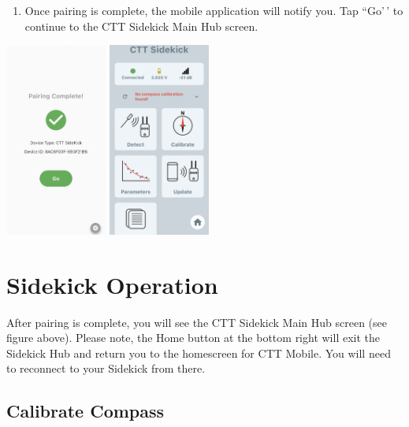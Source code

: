 \documentclass[
]{article}
\providecommand{\tightlist}{%
  \setlength{\itemsep}{0pt}\setlength{\parskip}{0pt}}
\begin{document}
\begin{enumerate}
\def\labelenumi{\arabic{enumi}.}
\setcounter{enumi}{3}
\tightlist
\item
  Once pairing is complete, the mobile application will notify you. Tap
  ``Go'\,' to continue to the CTT Sidekick Main Hub screen.
\end{enumerate}

\includegraphics[width=0.25\textwidth,height=\textheight]{./images/CTT Mobile_4.jpg}
\includegraphics[width=0.25\textwidth,height=\textheight]{./images/CTT Mobile_5.jpg}

\hypertarget{sidekick-operation}{%
\section{Sidekick Operation}\label{sidekick-operation}}

After pairing is complete, you will see the CTT Sidekick Main Hub screen
(see figure above). Please note, the Home button at the bottom right
will exit the Sidekick Hub and return you to the homescreen for CTT
Mobile. You will need to reconnect to your Sidekick from there.

\hypertarget{calibrate-compass}{%
\subsection{Calibrate Compass}\label{calibrate-compass}}
\end{document}
